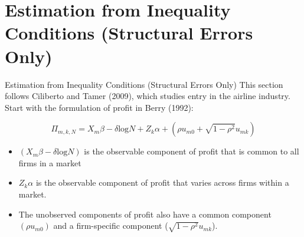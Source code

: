 \section{Estimation from Inequality Conditions (Structural Errors Only)}

\begin{frame}{\normalsize Estimation from Inequality Conditions (Structural Errors Only)}
This section follows Ciliberto and Tamer (2009), which studies entry in the airline industry.\\
\vspace{0.1in}
Start with the  formulation of profit in Berry (1992):

\begin{equation*}
\Pi_{m,k,N} =X_{m} \beta - \delta \text{log} N + Z_k \alpha +  (\rho u_{m0} + \sqrt{1- \rho^2} u_{mk})
\end{equation*}

\begin{itemize}
\item $(X_{m} \beta - \delta \text{log} N) $ is the observable component of profit that is common to all firms in a market
\item $Z_k \alpha$ is the observable component of profit that varies across firms within a market. 
\item The unobserved components of profit also have a common component $(\rho u_{m0}) $ and a firm-specific component ($\sqrt{1- \rho^2} u_{mk}$).
\end{itemize}
\end{frame}
